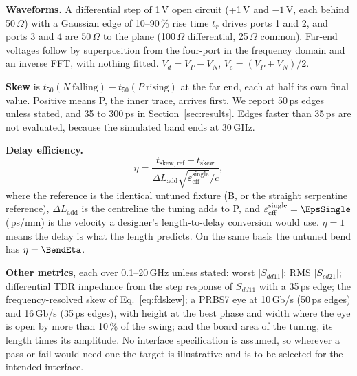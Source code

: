 \documentclass[10pt,twocolumn]{article}
\newcommand{\Sdd}[1]{S_{dd#1}}
\newcommand{\Scd}[1]{S_{cd#1}}
\newcommand{\eeff}{\varepsilon_{\mathrm{eff}}}
\begin{document}
\textbf{Waveforms.} A differential step of 1\,V open circuit (+1\,V and $-1$\,V, each behind 50\,$\Omega$) with a
Gaussian edge of 10--90\,\% rise time $t_r$ drives ports 1 and 2, and ports 3 and 4 are 50\,$\Omega$ to the plane
(100\,$\Omega$ differential, 25\,$\Omega$ common). Far-end voltages follow by superposition from the four-port in
the frequency domain and an inverse FFT, with nothing fitted. $V_d = V_P - V_N$, $V_c = (V_P + V_N)/2$.

\textbf{Skew} is $t_{50}(N\ \text{falling}) - t_{50}(P\ \text{rising})$ at the far end, each at half its own final
value. Positive means P, the inner trace, arrives first. We report 50\,ps edges unless stated, and 35 to 300\,ps
in Section~\ref{sec:results}. Edges faster than 35\,ps are not evaluated, because the simulated band ends at
30\,GHz.

\textbf{Delay efficiency.}
\begin{equation}
  \eta = \frac{t_\mathrm{skew,ref} - t_\mathrm{skew}}{\Delta L_\mathrm{add}\sqrt{\eeff^\mathrm{single}}/c},
  \label{eq:eta}
\end{equation}
where the reference is the identical untuned fixture (B, or the straight serpentine reference), $\Delta
L_\mathrm{add}$ is the centreline the tuning adds to P, and $\eeff^\mathrm{single} = \EpsSingle$
(\PsPerMm\,ps/mm) is the velocity a designer's length-to-delay conversion would use. $\eta = 1$ means the delay
is what the length predicts. On the same basis the untuned bend has $\eta = \BendEta$.

\textbf{Other metrics}, each over 0.1--20\,GHz unless stated: worst $|\Sdd{11}|$; RMS $|\Scd{21}|$; differential
TDR impedance from the step response of $\Sdd{11}$ with a 35\,ps edge; the frequency-resolved skew of
Eq.~\eqref{eq:fdskew}; a PRBS7 eye at 10\,Gb/s (50\,ps edges) and 16\,Gb/s (35\,ps edges), with height at the
best phase and width where the eye is open by more than 10\,\% of the swing; and the board area of the tuning,
its length times its amplitude. No interface specification is assumed, so wherever a pass or fail would need one the
target is illustrative and is to be selected for the intended interface.

\begin{table}[t]
\centering
\caption{Metrics, medium mesh, 50\,ps edge. $\Delta L_\mathrm{add}$ is the centreline the tuning adds to P;
$\eta$ is Eq.~\eqref{eq:eta}; MTL is the line model's skew; $|\Sdd{11}|$ and $|\Scd{21}|$ over 0.1--20\,GHz;
$Z_\mathrm{diff}$ from TDR. Skew bounds: each variant's own GCI where it was solved on three meshes, else that of the converged variant
whose smallest features it shares (Section~\ref{sec:verification}).}
\label{tab:metrics}
\footnotesize
{}
\end{table}
\end{document}
